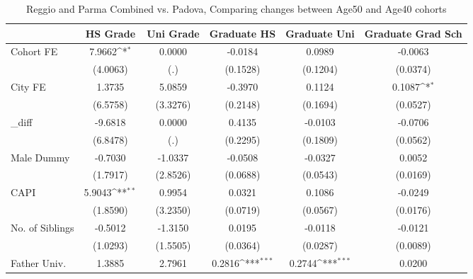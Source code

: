 \begin{table}[htbp]\centering
\def\sym#1{\ifmmode^{#1}\else\(^{#1}\)\fi}
\caption{Reggio and Parma Combined vs. Padova, Comparing changes between Age50 and Age40 cohorts}
\begin{tabular}{l*{5}{c}}
\toprule
            &\multicolumn{1}{c}{HS Grade}&\multicolumn{1}{c}{Uni Grade}&\multicolumn{1}{c}{Graduate HS}&\multicolumn{1}{c}{Graduate Uni}&\multicolumn{1}{c}{Graduate Grad Sch}\\
\midrule
Cohort FE   &      7.9662\sym{*}  &      0.0000         &     -0.0184         &      0.0989         &     -0.0063         \\
            &    (4.0063)         &         (.)         &    (0.1528)         &    (0.1204)         &    (0.0374)         \\
\addlinespace
City FE     &      1.3735         &      5.0859         &     -0.3970         &      0.1124         &      0.1087\sym{*}  \\
            &    (6.5758)         &    (3.3276)         &    (0.2148)         &    (0.1694)         &    (0.0527)         \\
\addlinespace
\_diff       &     -9.6818         &      0.0000         &      0.4135         &     -0.0103         &     -0.0706         \\
            &    (6.8478)         &         (.)         &    (0.2295)         &    (0.1809)         &    (0.0562)         \\
\addlinespace
Male Dummy  &     -0.7030         &     -1.0337         &     -0.0508         &     -0.0327         &      0.0052         \\
            &    (1.7917)         &    (2.8526)         &    (0.0688)         &    (0.0543)         &    (0.0169)         \\
\addlinespace
CAPI        &      5.9043\sym{**} &      0.9954         &      0.0321         &      0.1086         &     -0.0249         \\
            &    (1.8590)         &    (3.2350)         &    (0.0719)         &    (0.0567)         &    (0.0176)         \\
\addlinespace
No. of Siblings&     -0.5012         &     -1.3150         &      0.0195         &     -0.0118         &     -0.0121         \\
            &    (1.0293)         &    (1.5505)         &    (0.0364)         &    (0.0287)         &    (0.0089)         \\
\addlinespace
Father Univ.&      1.3885         &      2.7961         &      0.2816\sym{***}&      0.2744\sym{***}&      0.0200         \\

\end{tabular}
\end{table}
